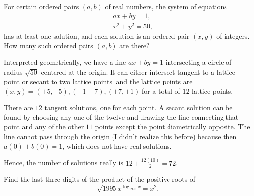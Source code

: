 \documentclass[11pt]{article}
\theoremstyle{definition}
\begin{document}
\begin{question}[name={1994 AIME, \href{https://artofproblemsolving.com/community/c4p394728}{Problem 7}}]
	For certain ordered pairs $(a,b)$ of real numbers, the system of equations\begin{eqnarray*} && ax+by =1,\\ &&x^2+y^2=50,\end{eqnarray*}has at least one solution, and each solution is an ordered pair $(x,y)$ of integers. How many such ordered pairs $(a,b)$ are there?
\end{question}


\begin{solution}[name={Solution by Qiaochu Yuan}]
	Interpreted geometrically, we have a line $ax + by = 1$ intersecting a circle of radius $\sqrt{50}$ centered at the origin. It can either intersect tangent to a lattice point or secant to two lattice points, and the lattice points are $(x, y) = (\pm 5, \pm 5), (\pm 1 \pm 7), (\pm 7, \pm 1)$ for a total of $12$ lattice points.
	
	There are $12$ tangent solutions, one for each point. A secant solution can be found by choosing any one of the twelve and drawing the line connecting that point and any of the other $11$ points except the point diametrically opposite. The line cannot pass through the origin (I didn't realize this before) because then $a(0) + b(0) = 1$, which does not have real solutions.
	
	Hence, the number of solutions really is $12 + \frac{12(10)}{2} = \boxed{72}$.
\end{solution}












\begin{question}[name={1995 AIME, \href{https://artofproblemsolving.com/community/c4p394465}{Problem 2}}]
	Find the last three digits of the product of the positive roots of\[ \sqrt{1995}x^{\log_{1995}x}=x^2. \]
\end{question}
\end{document}
